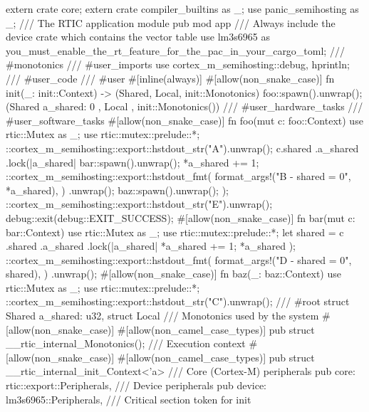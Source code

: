 extern crate core;
extern crate compiler_builtins as _;
use panic_semihosting as _;
/// The RTIC application module
pub mod app {
    /// Always include the device crate which contains the vector table
    use lm3s6965 as you_must_enable_the_rt_feature_for_the_pac_in_your_cargo_toml;
    /// #monotonics
    /// #user_imports
    use cortex_m_semihosting::{debug, hprintln};
    /// #user_code
    /// #user
    #[inline(always)]
    #[allow(non_snake_case)]
    fn init(_: init::Context) -> (Shared, Local, init::Monotonics) {
        foo::spawn().unwrap();
        (Shared { a_shared: 0 }, Local {}, init::Monotonics())
    }
    /// #user_hardware_tasks
    /// #user_software_tasks
    #[allow(non_snake_case)]
    fn foo(mut c: foo::Context) {
        use rtic::Mutex as _;
        use rtic::mutex::prelude::*;
        ::cortex_m_semihosting::export::hstdout_str("A\n").unwrap();
        c.shared
            .a_shared
            .lock(|a_shared| {
                bar::spawn().unwrap();
                *a_shared += 1;
                ::cortex_m_semihosting::export::hstdout_fmt(
                        format_args!("B - shared = {0}\n", *a_shared),
                    )
                    .unwrap();
                baz::spawn().unwrap();
            });
        ::cortex_m_semihosting::export::hstdout_str("E\n").unwrap();
        debug::exit(debug::EXIT_SUCCESS);
    }
    #[allow(non_snake_case)]
    fn bar(mut c: bar::Context) {
        use rtic::Mutex as _;
        use rtic::mutex::prelude::*;
        let shared = c
            .shared
            .a_shared
            .lock(|a_shared| {
                *a_shared += 1;
                *a_shared
            });
        ::cortex_m_semihosting::export::hstdout_fmt(
                format_args!("D - shared = {0}\n", shared),
            )
            .unwrap();
    }
    #[allow(non_snake_case)]
    fn baz(_: baz::Context) {
        use rtic::Mutex as _;
        use rtic::mutex::prelude::*;
        ::cortex_m_semihosting::export::hstdout_str("C\n").unwrap();
    }
    /// #root
    struct Shared {
        a_shared: u32,
    }
    struct Local {}
    /// Monotonics used by the system
    #[allow(non_snake_case)]
    #[allow(non_camel_case_types)]
    pub struct __rtic_internal_Monotonics();
    /// Execution context
    #[allow(non_snake_case)]
    #[allow(non_camel_case_types)]
    pub struct __rtic_internal_init_Context<'a> {
        /// Core (Cortex-M) peripherals
        pub core: rtic::export::Peripherals,
        /// Device peripherals
        pub device: lm3s6965::Peripherals,
        /// Critical section token for init
}}
